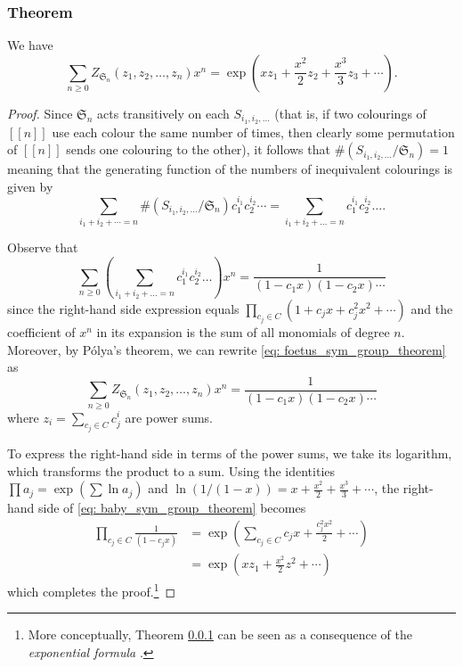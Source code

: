 \documentclass[a4paper,11pt]{article}
\numberwithin{equation}{section}
\def\llbracket{[\![}
\def\rrbracket{]\!]}
\begin{document}
    \subsubsection{Theorem} \label{sym_group_theorem} We have \begin{equation}
    \label{eq: sym_group_thm}
    \sum_{n \geq 0 } Z_{\mathfrak
    {S}_{n}}(z_{1},z_{2},\dots,z_{n})x^{n}= \exp\left( xz_{1}+ \frac{x^{2}}{2} z_{2} + \frac{x^{3}}{3}z_{3} +\cdots \right) .
    \end{equation}  

    \begin{proof} Since $\mathfrak{S}_n$ acts transitively on each $S_{i_{1}, i_{2}, \dots}$ (that is, if two colourings of $\llbracket n \rrbracket$ use each colour the same number of times, then clearly some permutation of $\llbracket n \rrbracket$ sends one colouring to the other), it follows that $\# (S_{i_{1}, i_{2}, \dots}/\mathfrak{S}_{n})=1$ meaning that the generating function of the numbers of inequivalent colourings is given by 
    \begin{equation}
    \sum_{i_1 + i_2 + \cdots = n } \# (S_{i_{1}, i_{2}, \dots}/\mathfrak
    {S}_{n})  c_{1}^{i_{1}}c_{2}^{i_{2}} \cdots   =  \sum_{i_{1}+i_{2}+\dots =n} c_{1}^{i_{1}} c_{2}^{i_{2}} \dots . \label{eq: sym_1} 
    \end{equation} 
    
    Observe that 
    \begin{equation}
        \sum_{n \geq 0}  \left( \sum_{i_{1}+i_{2}+\dots =n} c_{1}^{i_{1}} c_{2}^{i_{2}} \dots  \right)  x^n = \frac{1}{(1-c_{1}x)(1-c_{2}x)\cdots} \label{eq: foetus_sym_group_theorem}
    \end{equation} 
    since the right-hand side expression equals $\prod_{c_j\in C}(1+c_{j}x+c_{j}^2x^2+\cdots)$ and the coefficient of $x^n$ in its expansion is the sum of all monomials of degree $n$. Moreover, by Pólya’s theorem, we can rewrite \eqref{eq: foetus_sym_group_theorem} as
    \begin{equation}
        \sum_{n \geq 0} Z_{\mathfrak{S}_n} (z_1, z_2, \dots, z_n)   x^n = \frac{1}{(1-c_{1}x)(1-c_{2}x)\cdots} \label{eq: baby_sym_group_theorem}
    \end{equation} 
    where $z_i = \sum_{c_j \in C} c_j^i$ are power sums. \smallskip
    
    To express the right-hand side in terms of the power sums, we take its logarithm, which transforms the product to a sum. Using the identities $\prod a_j = \exp (\sum \ln a_j)$ and $\ln\left( {1}/(1-x) \right)=x+\frac{x^2}{2}+\frac{x^3}{3}+\cdots$, the right-hand side of \eqref{eq: baby_sym_group_theorem} becomes
    \begin{align*}
    \prod_{c_{j} \in C} \frac{1}{(1-c_{j}x)} &= \exp \left( \sum_{c_j\in C} c_j x + \frac{c_j^2 x^2}{2} + \cdots \right) \\
    &= \exp(xz_1 + \frac{x^2}{2}z^2 + \cdots) \end{align*}which completes the proof.\footnote{More conceptually, Theorem \ref{sym_group_theorem} can be seen as a consequence of the \textit{exponential formula} \cite[p.~19]{stanleyEnumerativeCombinatoricsVolume1999}.}
    \end{proof}
    
\end{document}

